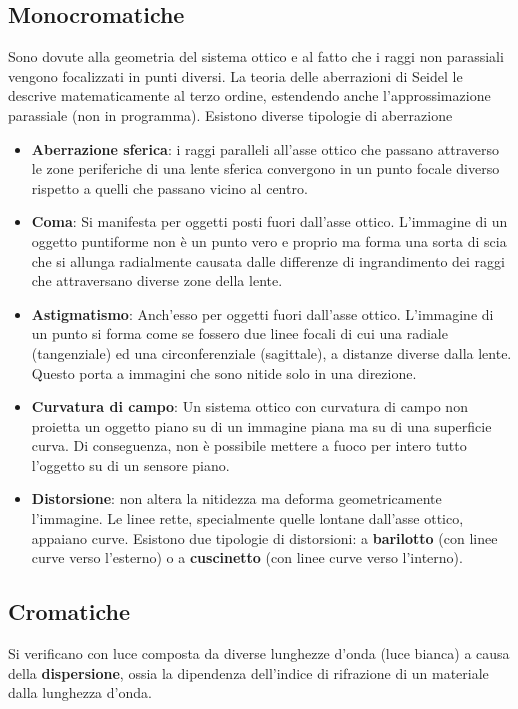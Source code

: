 \documentclass[a4paper, oneside]{book}
\begin{document}
\subsection{Monocromatiche}
Sono dovute alla geometria del sistema ottico e al fatto che i raggi non parassiali vengono 
focalizzati in punti diversi. La teoria delle aberrazioni di Seidel le descrive matematicamente al terzo ordine, estendendo 
anche l'approssimazione parassiale (non in programma). Esistono diverse tipologie di aberrazione
\begin{itemize}
    \item \textbf{Aberrazione sferica}: i raggi paralleli all'asse ottico che passano 
    attraverso le zone periferiche di una lente sferica convergono in un punto focale diverso rispetto a quelli che passano vicino al centro. 
    \item \textbf{Coma}: Si manifesta per oggetti posti fuori dall'asse ottico. L'immagine di un
    oggetto puntiforme non è un punto vero e proprio ma forma una sorta di scia che si allunga radialmente causata
    dalle differenze di ingrandimento dei raggi che attraversano diverse zone della lente. 
    \item \textbf{Astigmatismo}: Anch'esso per oggetti fuori dall'asse ottico. L'immagine 
    di un punto si forma come se fossero due linee focali di cui una radiale (tangenziale) ed una circonferenziale (sagittale),
    a distanze diverse dalla lente. Questo porta a immagini che sono nitide solo in una direzione. 
    \item \textbf{Curvatura di campo}: Un sistema ottico con curvatura di campo non proietta un oggetto piano su di un immagine 
    piana ma su di una superficie curva. Di conseguenza, non è possibile mettere a fuoco per intero tutto l'oggetto su di un sensore piano.
    \item \textbf{Distorsione}: non altera la nitidezza ma deforma geometricamente l'immagine. Le linee rette, specialmente quelle lontane dall'asse 
    ottico, appaiano curve. Esistono due tipologie di distorsioni: a \textbf{barilotto} (con linee curve verso l'esterno) o a \textbf{cuscinetto} 
    (con linee curve verso l'interno). 
\end{itemize}

\subsection{Cromatiche}
Si verificano con luce composta da diverse lunghezze d'onda (luce bianca) a causa della \textbf{dispersione}, ossia la dipendenza 
dell'indice di rifrazione di un materiale dalla lunghezza d'onda. 
\end{document}

